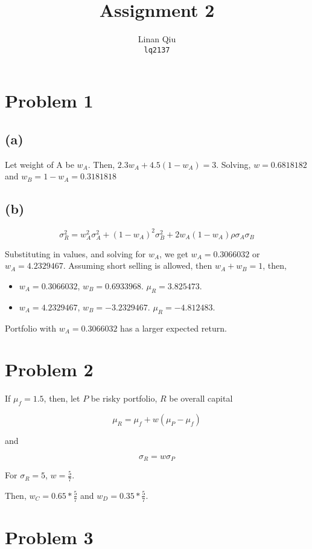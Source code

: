 \documentclass[11pt]{scrartcl}
\title{Assignment 2}
\author{Linan Qiu\\\texttt{lq2137}}
\begin{document}
\maketitle

\section*{Problem 1}

\subsection*{(a)}

Let weight of A be $w_A$. Then, $2.3w_A + 4.5(1-w_A) = 3$. Solving, $w = 0.6818182$ and $w_B = 1 - w_A = 0.3181818$

\subsection*{(b)}

\[\sigma_R^2 = w_A^2 \sigma_A^2 + (1-w_A)^2\sigma_B^2 + 2w_A(1-w_A)\rho \sigma_A \sigma_B\]

Substituting in values, and solving for $w_A$, we get $w_A = 0.3066032$ or $w_A=4.2329467$. Assuming short selling is allowed, then $w_A + w_B = 1$, then,

\begin{itemize}
\item $w_A = 0.3066032$, $w_B = 0.6933968$. $\mu_R = 3.825473$.
\item $w_A = 4.2329467$, $w_B = -3.2329467$. $\mu_R = -4.812483$.
\end{itemize}

Portfolio with $w_A = 0.3066032$ has a larger expected return.

\section*{Problem 2}

If $\mu_f = 1.5$, then, let $P$ be risky portfolio, $R$ be overall capital

\[\mu_R = \mu_f + w(\mu_P - \mu_f)\]

and

\[\sigma_R = w\sigma_P\]

For $\sigma_R = 5$, $w = \frac{5}{7}$. 

Then, $w_C = 0.65 * \frac{5}{7}$ and $w_D = 0.35 * \frac{5}{7}$.

\section*{Problem 3}
\end{document}
